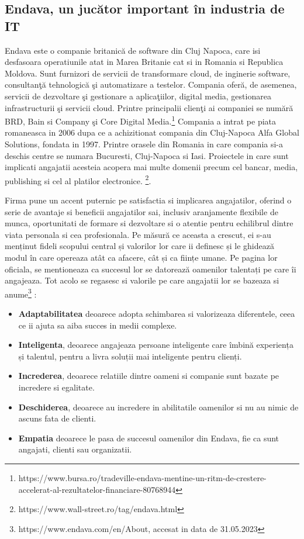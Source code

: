 \documentclass[a4paper, 12pt]{article}
\begin{document}
	\subsection {Endava, un jucător important în industria de IT}

	\quad\quad Endava este o companie britanică de software din Cluj Napoca, care isi  desfasoara operatiunile atat in Marea Britanie cat si in Romania si Republica Moldova. Sunt furnizori de servicii de transformare cloud, de inginerie software, consultanţă tehnologică şi automatizare a testelor. Compania oferă, de asemenea, servicii de dezvoltare şi gestionare a aplicaţiilor, digital media, gestionarea infrastructurii şi servicii cloud. Printre principalii clienţi ai companiei se numără BRD, Bain si Company şi Core Digital Media.\footnote{https://www.bursa.ro/tradeville-endava-mentine-un-ritm-de-crestere-accelerat-al-rezultatelor-financiare-80768944} Compania a intrat pe piata romaneasca in 2006 dupa ce a achizitionat compania din Cluj-Napoca Alfa Global Solutions, fondata in 1997. Printre orasele din Romania in care compania si-a deschis centre se numara Bucuresti, Cluj-Napoca si Iasi. Proiectele in care sunt implicati angajatii acesteia acopera mai multe domenii precum cel bancar, media, publishing si cel al platilor electronice. \footnote{https://www.wall-street.ro/tag/endava.html}.



	\quad \quad Firma pune un accent puternic pe satisfactia si implicarea angajatilor, oferind o serie de avantaje si beneficii angajatilor sai, inclusiv aranjamente flexibile de munca, oportunitati de formare si dezvoltare si o atentie pentru echilibrul dintre viata personala si cea profesionala. Pe măsură ce aceasta a crescut, ei s-au menținut fideli scopului central și valorilor lor care ii definesc și le ghidează modul în care opereaza  atât ca afacere, cât și ca ființe umane. Pe pagina lor oficiala, se mentioneaza ca succesul lor se datorează oamenilor talentați pe care îi angajeaza. Tot acolo se regasesc si valorile pe care angajatii lor se bazeaza si anume\footnote{https://www.endava.com/en/About, accesat in data de 31.05.2023} :
	\begin{itemize}

	\item  \textbf{Adaptabilitatea} deoarece adopta schimbarea si valorizeaza diferentele, ceea ce ii ajuta sa aiba succes in medii complexe.
	\item \textbf{Inteligenta}, deoarece angajeaza persoane inteligente care îmbină experiența și talentul, pentru a livra soluții mai inteligente pentru clienți.
	\item \textbf{Increderea}, deoarece relatiile dintre oameni si companie sunt bazate pe incredere si egalitate.
	\item \textbf{Deschiderea}, deoarece au incredere in abilitatile oamenilor si nu au nimic de ascuns fata de clienti.
	\item \textbf{Empatia} deoarece le pasa de succesul oamenilor din Endava, fie ca sunt angajati, clienti sau organizatii.

	\end{itemize}
\end{document}
